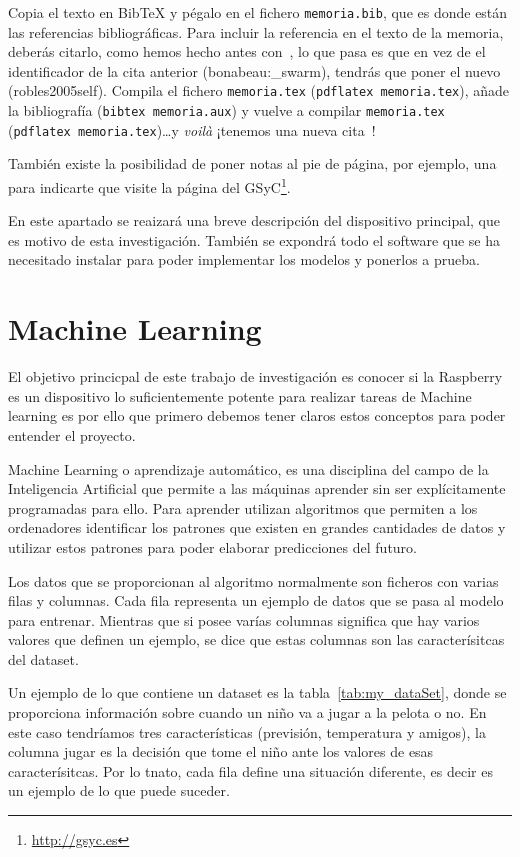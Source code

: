 \documentclass[a4paper, 12pt]{book}
\begin{document}
Copia el texto en BibTeX y pégalo en el fichero \texttt{memoria.bib}, que es donde están las referencias bibliográficas.
Para incluir la referencia en el texto de la memoria, deberás citarlo, como hemos hecho antes con~\cite{bonabeau:_swarm}, lo que pasa es que en vez de el identificador de la cita anterior (bonabeau:\_swarm), tendrás que poner el nuevo (robles2005self).
Compila el fichero \texttt{memoria.tex} (\texttt{pdflatex memoria.tex}), añade la bibliografía (\texttt{bibtex memoria.aux}) y vuelve a compilar \texttt{memoria.tex} (\texttt{pdflatex memoria.tex})\ldots y \emph{voilà} ¡tenemos una nueva cita~\cite{robles2005self}!

También existe la posibilidad de poner notas al pie de página, por ejemplo, una para indicarte que visite la página del GSyC\footnote{\url{http://gsyc.es}}.

En este apartado se reaizará una breve descripción del dispositivo principal, que es motivo de esta investigación. También se expondrá todo el software que se ha necesitado instalar para poder implementar los modelos y ponerlos a prueba.

\section{Machine Learning}
\label{sec:machine_learning}

El objetivo princicpal de este trabajo de investigación es conocer si la Raspberry es un dispositivo lo suficientemente potente para realizar tareas de Machine learning es por ello que primero debemos tener claros estos conceptos para poder entender el proyecto.

 Machine Learning o aprendizaje automático, es una disciplina del campo de la Inteligencia Artificial que permite a las máquinas aprender sin ser explícitamente programadas para ello. Para aprender utilizan algoritmos que permiten a los ordenadores identificar los patrones que existen en grandes cantidades de datos y utilizar estos patrones para poder elaborar predicciones del futuro. 
 
 Los datos que se proporcionan al algoritmo normalmente son ficheros con varias filas y columnas. Cada fila representa un ejemplo de datos que se pasa al modelo para entrenar. Mientras que si posee varías columnas significa que hay varios valores que definen un ejemplo, se dice que estas columnas son las caracterísitcas del dataset. 
 
 Un ejemplo de lo que contiene un dataset es la tabla~\ref{tab:my_dataSet}, donde se proporciona información sobre cuando un niño va a jugar a la pelota o no. En este caso tendríamos tres características (previsión, temperatura y amigos), la columna jugar es la decisión que tome el niño ante los valores de esas caracterísitcas. Por lo tnato, cada fila define una situación diferente, es decir es un ejemplo de lo que puede suceder.
 
\end{document}
